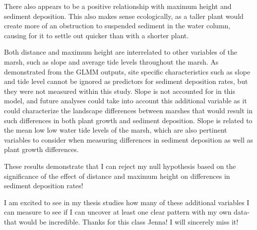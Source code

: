 \documentclass[
]{article}
\begin{document}
There also appears to be a positive relationship with maximum height and
sediment deposition. This also makes sense ecologically, as a taller
plant would create more of an obstruction to suspended sediment in the
water column, causing for it to settle out quicker than with a shorter
plant.

Both distance and maximum height are interrelated to other variables of
the marsh, such as slope and average tide levels throughout the marsh.
As demonstrated from the GLMM outputs, site specific characteristics
such as slope and tide level cannot be ignored as predictors for
sediment deposition rates, but they were not measured within this study.
Slope is not accounted for in this model, and future analyses could take
into account this additional variable as it could characterize the
landscape differences between marshes that would result in such
differences in both plant growth and sediment deposition. Slope is
related to the mean low low water tide levels of the marsh, which are
also pertinent variables to consider when measuring differences in
sediment deposition as well as plant growth differences.

These results demonstrate that I can reject my null hypothesis based on
the significance of the effect of distance and maximum height on
differences in sediment deposition rates!

I am excited to see in my thesis studies how many of these additional
variables I can measure to see if I can uncover at least one clear
pattern with my own data-that would be incredible. Thanks for this class
Jenna! I will sincerely miss it!
\end{document}
